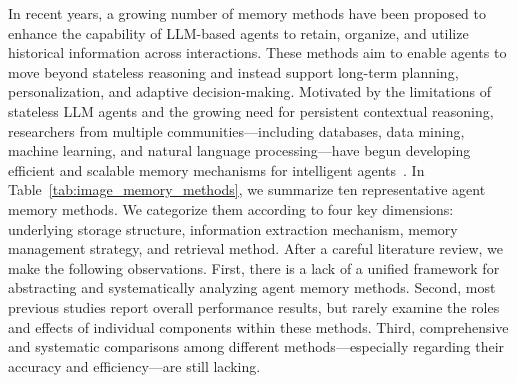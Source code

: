 
In recent years, a growing number of memory methods have been proposed to enhance the capability of LLM-based agents to retain, organize, and utilize historical information across interactions. These methods aim to enable agents to move beyond stateless reasoning and instead support long-term planning, personalization, and adaptive decision-making.
Motivated by the limitations of stateless LLM agents and the growing need for persistent contextual reasoning, researchers from multiple communities---including databases, data mining, machine learning, and natural language processing---have begun developing efficient and scalable memory mechanisms for intelligent agents~\cite{rezazadeh2024isolated, packer2023memgpt, park2023generativeagents, weng2023agent, wang2024llmagentsurvey}.
In Table~\ref{tab:image_memory_methods}, we summarize ten representative agent memory methods. We categorize them according to four key dimensions: underlying storage structure, information extraction mechanism, memory management strategy, and retrieval method.
%
After a careful literature review, we make the following observations. First, there is a lack of a unified framework for abstracting and systematically analyzing agent memory methods. Second, most previous studies report overall performance results, but rarely examine the roles and effects of individual components within these methods. Third, comprehensive and systematic comparisons among different methods—especially regarding their accuracy and efficiency—are still lacking.

